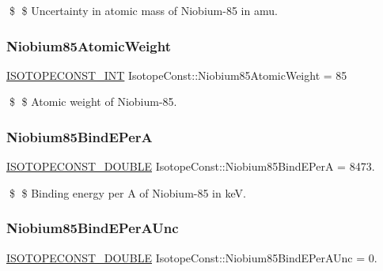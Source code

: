 \$ \$ Uncertainty in atomic mass of Niobium-\/85 in amu. \mbox{\label{group___isotope_const-_niobium-_nb85_gaba13ec75951e0b4237215cba9e74595d}} 
\subsubsection{\texorpdfstring{Niobium85\+Atomic\+Weight}{Niobium85AtomicWeight}}
{\footnotesize\ttfamily \mbox{\hyperlink{group___isotope_const-_macros_ga5f18360b3e99483a35c32d789e62621c}{I\+S\+O\+T\+O\+P\+E\+C\+O\+N\+S\+T\+\_\+\+I\+NT}} Isotope\+Const\+::\+Niobium85\+Atomic\+Weight = 85}

\$ \$ Atomic weight of Niobium-\/85. \mbox{\label{group___isotope_const-_niobium-_nb85_gad8e0adfa26e550c66d6da2d9facdeae9}} 
\subsubsection{\texorpdfstring{Niobium85\+Bind\+E\+PerA}{Niobium85BindEPerA}}
{\footnotesize\ttfamily \mbox{\hyperlink{group___isotope_const-_macros_ga8f45a7272ce02c0b4c65c44636ed719a}{I\+S\+O\+T\+O\+P\+E\+C\+O\+N\+S\+T\+\_\+\+D\+O\+U\+B\+LE}} Isotope\+Const\+::\+Niobium85\+Bind\+E\+PerA = 8473.}

\$ \$ Binding energy per A of Niobium-\/85 in keV. \mbox{\label{group___isotope_const-_niobium-_nb85_ga2a0e9a1452a5dd85ce94f81daba3718d}} 
\subsubsection{\texorpdfstring{Niobium85\+Bind\+E\+Per\+A\+Unc}{Niobium85BindEPerAUnc}}
{\footnotesize\ttfamily \mbox{\hyperlink{group___isotope_const-_macros_ga8f45a7272ce02c0b4c65c44636ed719a}{I\+S\+O\+T\+O\+P\+E\+C\+O\+N\+S\+T\+\_\+\+D\+O\+U\+B\+LE}} Isotope\+Const\+::\+Niobium85\+Bind\+E\+Per\+A\+Unc = 0.}

